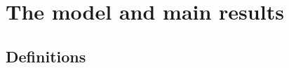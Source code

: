 \documentclass[pdflatex,sn-mathphys-num]{sn-jnl}%
\theoremstyle{thmstyleone}%
\theoremstyle{thmstyletwo}%
\theoremstyle{thmstylethree}%
\begin{document}



\section{The model and main results\label{sec2}}

\subsection{Definitions}
\end{document}
